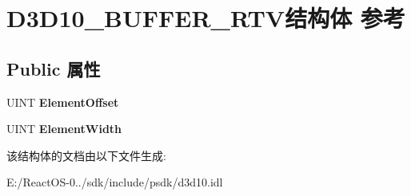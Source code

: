 \hypertarget{struct_d3_d10___b_u_f_f_e_r___r_t_v}{}\section{D3\+D10\+\_\+\+B\+U\+F\+F\+E\+R\+\_\+\+R\+T\+V结构体 参考}
\label{struct_d3_d10___b_u_f_f_e_r___r_t_v}
\subsection*{Public 属性}
\begin{DoxyCompactItemize}
\item 
\mbox{\label{struct_d3_d10___b_u_f_f_e_r___r_t_v_a122fce733347e778d918bec377e27b12}} 
U\+I\+NT {\bfseries Element\+Offset}
\item 
\mbox{\label{struct_d3_d10___b_u_f_f_e_r___r_t_v_a578b4ad416e3ceb84d61d6c9fb7afa1a}} 
U\+I\+NT {\bfseries Element\+Width}
\end{DoxyCompactItemize}


该结构体的文档由以下文件生成\+:\begin{DoxyCompactItemize}
\item 
E\+:/\+React\+O\+S-\/0../sdk/include/psdk/d3d10.\+idl\end{DoxyCompactItemize}
